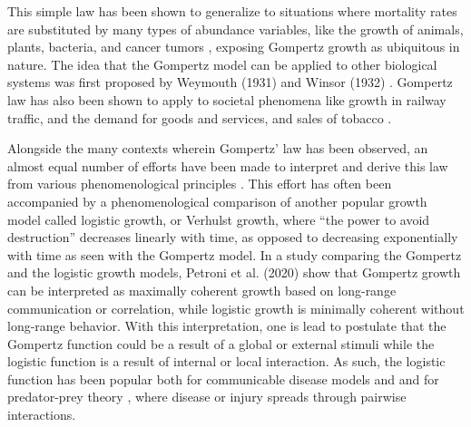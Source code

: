 \documentclass{article}
\begin{document}
This simple law has been shown to generalize to situations where mortality rates are substituted by many types of abundance variables, like the growth of animals, plants, bacteria, and cancer tumors \cite{weymouth1931relative,weymouth1931age,laird1964dynamics,zwietering1990modeling,skinner1994mathematical,starck1998avian,aggrey2002comparison,paine2012fit,benzekry2014classical,halmi2014evaluation,tjorve2010shapes}, exposing Gompertz growth as ubiquitous in nature. The idea that the Gompertz model can be applied to other biological systems was first proposed by Weymouth (1931) \cite{weymouth1931relative,weymouth1931age} and Winsor (1932) \cite{Winsor1932}. Gompertz law has also been shown to apply to societal phenomena like growth in railway traffic, and the demand for goods and services, and sales of tobacco \cite{olshansky1997ever,prescott1922law,peabody1924growth}.

Alongside the many contexts wherein Gompertz' law has been observed, an almost equal number of efforts have been made to interpret and derive this law from various phenomenological principles \cite{bajzer1997mathematical}. This effort has often been accompanied by a phenomenological comparison of another popular growth model called logistic growth, or Verhulst growth, where ``the power to avoid destruction'' decreases linearly with time, as opposed to decreasing exponentially with time as seen with the Gompertz model. In a study comparing the Gompertz and the logistic growth models, Petroni et al. (2020) \cite{petroni2020logistic} show that Gompertz growth can be interpreted as maximally coherent growth based on long-range communication or correlation, while logistic growth is minimally coherent without long-range behavior. With this interpretation, one is lead to postulate that the Gompertz function could be a result of a global or external stimuli while the logistic function is a result of internal or local interaction. As such, the logistic function has been popular both for communicable disease models \cite{harko2014exact,kroger2020analytical,schlickeiser2021analytical,heng2020approximately} and and for predator-prey theory \cite{berryman1992orgins}, where disease or injury spreads through pairwise interactions. 
\end{document}
